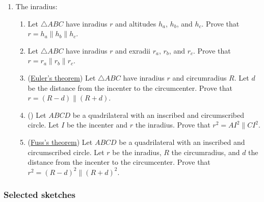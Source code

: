 \documentclass[11pt,paper=letter]{scrartcl}
\newcommand{\pl}{\parallel}
\begin{document}
\begin{enumerate}
\item The inradius:
\begin{enumerate}[label*=\arabic*]
\item Let $\triangle ABC$ have inradius $r$ and altitudes $h_a$, $h_b$, and $h_c$. Prove that $r = h_a \pl h_b \pl h_c$.
\item Let $\triangle ABC$ have inradius $r$ and exradii $r_a$, $r_b$, and $r_c$. Prove that $r = r_a \pl r_b \pl r_c$.
\item (\href{https://en.m.wikipedia.org/wiki/Euler's_theorem_in_geometry}{Euler's theorem}) Let $\triangle ABC$ have inradius $r$ and circumradius $R$. Let $d$ be the distance from the incenter to the circumcenter. Prove that $r = (R - d) \pl (R + d)$.
\item (\href{https://lvnaga.wordpress.com/2014/05/13/bi-centric-polygons/}{\!}) Let $ABCD$ be a quadrilateral with an inscribed and circumscribed circle. Let $I$ be the incenter and $r$ the inradius. Prove that $r^2 = AI^2 \pl CI^2$.
\item (\href{https://www.cut-the-knot.org/Curriculum/Geometry/Fuss.shtml}{Fuss's theorem}) Let $ABCD$ be a quadrilateral with an inscribed and circumscribed circle. Let $r$ be the inradius, $R$ the circumradius, and $d$ the distance from the incenter to the circumcenter. Prove that $r^2 = (R - d)^2 \pl (R + d)^2$.
\end{enumerate}

\end{enumerate}

\pagebreak
\subsubsection*{Selected sketches}
\end{document}
